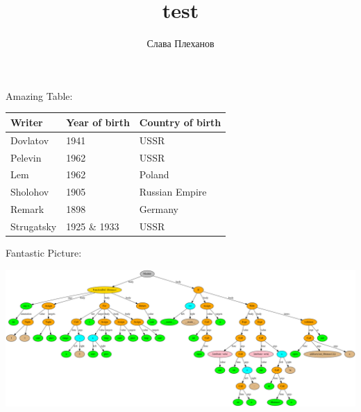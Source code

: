 \documentclass{article}
\title{test}
\author{Слава Плеханов}
\begin{document}
    \begin{center}
        Amazing Table:
    \end{center}
\begin{tabular}{ | l | l | l | }
\hline
Writer & Year of birth & Country of birth \\ \hline
Dovlatov & 1941 & USSR\\
Pelevin & 1962 & USSR\\
Lem & 1962 & Poland\\
Sholohov & 1905 & Russian Empire\\
Remark & 1898 & Germany\\
Strugatsky & 1925 \& 1933 & USSR\\
\hline\end{tabular}
    \hfill \break
    \hfill \break
    \hfill \break
    \hfill \break
    \hfill \break

    \begin{center}
        Fantastic Picture:
    \end{center}
\includegraphics[scale=0.15]{tree.png}
\end{document}
